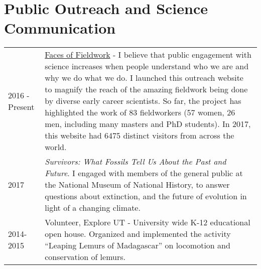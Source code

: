 \documentclass{article}
\begin{document}
\section*{Public Outreach and Science Communication}
\begin{longtable}{p{}p{}}
2016 - Present & \href{http://facesoffieldwork.com}{Faces of Fieldwork} - I believe that public engagement with science increases when people understand who we are and why we do what we do. I launched this outreach website to magnify the reach of the amazing fieldwork being done by diverse early career scientists. So far, the project has highlighted the work of 83 fieldworkers (57 women, 26 men, including many masters and PhD students). In 2017, this website had 6475 distinct visitors from across the world.\\[4pt]
2017 & \emph{Survivors: What Fossils Tell Us About the Past and Future}. I engaged with members of the general public at the National Museum of National History, to answer questions about extinction, and the future of evolution in light of a changing climate. \\[4pt]

2014-2015 & Volunteer, Explore UT - University wide K-12 educational open house. Organized and implemented the activity ``Leaping Lemurs of Madagascar'' on locomotion and conservation of lemurs.\\
\end{longtable}
\end{document}
